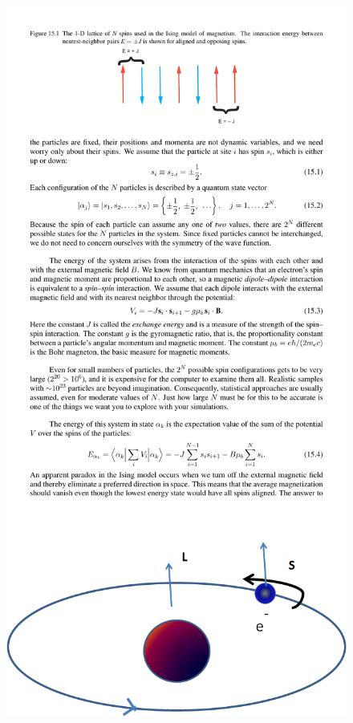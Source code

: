 \documentclass[hyperref={colorlinks=true}]{beamer}
\begin{document}
\begin{frame}
\begin{columns}
    \begin{figure}
      \centering
      \includegraphics[width=\columnwidth]{Ising-spins-1D-interaction.pdf}\\
      \includegraphics[width=\columnwidth]{SpinOrbitMoment.png}
    \end{figure}
  
  \end{columns}

  

\end{frame}
\end{document}
